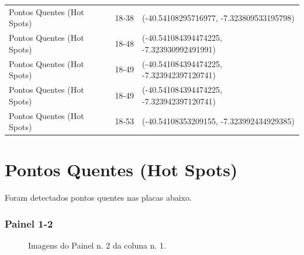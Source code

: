 \documentclass[dvipsnames]{article}%
\begin{document}
\begin{table}[h!]
\begin{tabular}{lll}
Pontos Quentes (Hot Spots)&18{-}38&({-}40.54108295716977, {-}7.323809533195798)\\%
Pontos Quentes (Hot Spots)&18{-}48&({-}40.541084394474225, {-}7.323930992491991)\\%
Pontos Quentes (Hot Spots)&18{-}49&({-}40.541084394474225, {-}7.323942397120741)\\%
Pontos Quentes (Hot Spots)&18{-}49&({-}40.541084394474225, {-}7.323942397120741)\\%
Pontos Quentes (Hot Spots)&18{-}53&({-}40.54108353209155, {-}7.323992434929385)\\%
\bottomrule%
\end{tabular}%
\end{table}

%
\FloatBarrier%
\newpage%
\section{Pontos Quentes (Hot Spots)}%
Foram detectados pontos quentes nas placas abaixo.\newline%
%
\subsubsection{Painel 1-2}%


\begin{figure}[h!]%
\centering%
%
\hfill%
%
\hfill%
%
\caption{Imagens do Painel n. 2 da coluna n. 1.}%
\end{figure}
\end{document}
